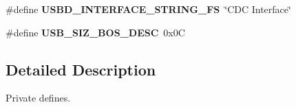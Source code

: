 \begin{DoxyCompactItemize}
\item 
\mbox{\label{group__USBD__DESC__Private__Defines_ga2562ccc9162020b79f07d813eba10ddb}} 
\#define {\bfseries U\+S\+B\+D\+\_\+\+I\+N\+T\+E\+R\+F\+A\+C\+E\+\_\+\+S\+T\+R\+I\+N\+G\+\_\+\+FS}~\char`\"{}C\+DC Interface\char`\"{}
\item 
\mbox{\label{group__USBD__DESC__Private__Defines_ga3d6767367e9b15bae8d264a78102aba8}} 
\#define {\bfseries U\+S\+B\+\_\+\+S\+I\+Z\+\_\+\+B\+O\+S\+\_\+\+D\+E\+SC}~0x0C
\end{DoxyCompactItemize}


\subsection{Detailed Description}
Private defines. 

